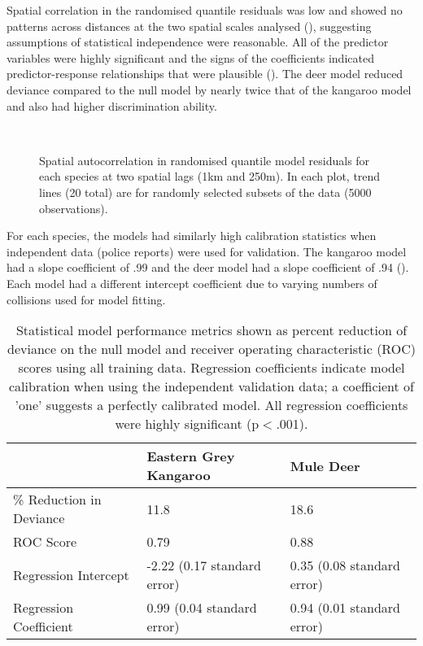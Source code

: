 Spatial correlation in the randomised quantile residuals was low and showed no patterns across distances at the two spatial scales analysed (), suggesting assumptions of statistical independence were reasonable. All of the predictor variables were highly significant and the signs of the coefficients indicated predictor-response relationships that were plausible (). The deer model reduced deviance compared to the null model by nearly twice that of the kangaroo model and also had higher discrimination ability.

\begin{figure*}[htp]
  \captionsetup[subfloat]{farskip=-2pt,nearskip=-2pt}
  \centering
  \\
  \caption[Spatial autocorrelation in randomised quantile model residuals for kangaroos and deer]{Spatial autocorrelation in randomised quantile model residuals for each species at two spatial lags (1km and 250m).  In each plot, trend lines (20 total) are for randomly selected subsets of the data (5000 observations).}
  \label{cal_sac}
\end{figure*}

For each species, the models had similarly high calibration statistics when independent data (police reports) were used for validation. The kangaroo model had a slope coefficient of .99 and the deer model had a slope coefficient of .94 (). Each model had a different intercept coefficient due to varying numbers of collisions used for model fitting.

\begin{table}[htp]
\caption[Statistical model performance for kangaroos and deer]{Statistical model performance metrics shown as percent reduction of deviance on the null model and receiver operating characteristic (ROC) scores using all training data. Regression coefficients indicate model calibration when using the independent validation data; a coefficient of 'one' suggests a perfectly calibrated model.  All regression coefficients were highly significant (p$<$.001).}
\begin{tabularx}{\textwidth}{lll} \toprule
                        	&Eastern Grey Kangaroo			&Mule Deer \\ \midrule 
\% Reduction in Deviance 	& 11.8							& 18.6  \\ 
ROC Score 					& 0.79							& 0.88	\\ 
Regression Intercept 		& -2.22 (0.17 standard error)	& 0.35 (0.08 standard error) \\ 
Regression Coefficient 		& 0.99 (0.04 standard error)	& 0.94 (0.01 standard error) \\ 
\bottomrule
\end{tabularx}
\label{cal_model_perf}
\end{table}

